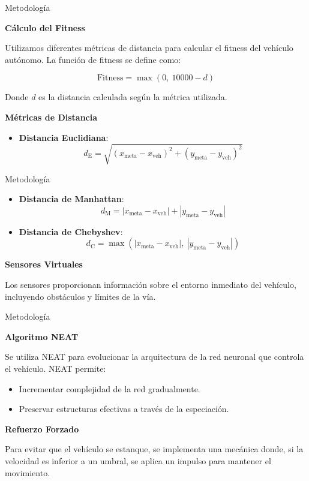 \documentclass{beamer}
\begin{document}
\begin{frame}{Metodología}

\textbf{Cálculo del Fitness}

Utilizamos diferentes métricas de distancia para calcular el fitness del vehículo autónomo. La función de fitness se define como:

\[
\text{Fitness} = \max\left(0,\  10000 - d \right)
\]

Donde \( d \) es la distancia calculada según la métrica utilizada.

\textbf{Métricas de Distancia}
\begin{itemize}
  \item \textbf{Distancia Euclidiana}:
  \[
  d_{\text{E}} = \sqrt{(x_{\text{meta}} - x_{\text{veh}})^2 + (y_{\text{meta}} - y_{\text{veh}})^2}
  \]
  
\end{itemize}

\end{frame}

\begin{frame}{Metodología}
  \begin{itemize}
    \item \textbf{Distancia de Manhattan}:
  \[
  d_{\text{M}} = |x_{\text{meta}} - x_{\text{veh}}| + |y_{\text{meta}} - y_{\text{veh}}|
  \]
  
    \item \textbf{Distancia de Chebyshev}:
    \[
    d_{\text{C}} = \max\left( |x_{\text{meta}} - x_{\text{veh}}|,\  |y_{\text{meta}} - y_{\text{veh}}| \right)
    \]
  \end{itemize}
 

\textbf{Sensores Virtuales}

Los sensores proporcionan información sobre el entorno inmediato del vehículo, incluyendo obstáculos y límites de la vía.

\end{frame}

\begin{frame}{Metodología}

  \textbf{Algoritmo NEAT}

Se utiliza NEAT para evolucionar la arquitectura de la red neuronal que controla el vehículo. NEAT permite:

\begin{itemize}
    \item Incrementar complejidad de la red gradualmente.
    \item Preservar estructuras efectivas a través de la especiación.
\end{itemize}


  \textbf{Refuerzo Forzado}

Para evitar que el vehículo se estanque, se implementa una mecánica donde, si la velocidad es inferior a un umbral, se aplica un impulso para mantener el movimiento.

\end{frame}
\end{document}
